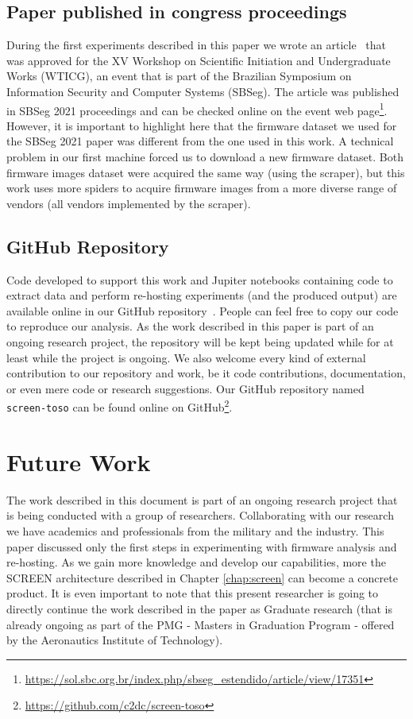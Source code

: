 \subsection{Paper published in congress proceedings}
During the first experiments described in this paper we wrote an article~\cite{sbseg2021} that was approved for the XV Workshop on Scientific Initiation and Undergraduate Works (WTICG), an event that is part of the Brazilian Symposium on Information Security and Computer Systems (SBSeg). The article was published in SBSeg 2021 proceedings and can be checked online on the event web page\footnote{\url{https://sol.sbc.org.br/index.php/sbseg_estendido/article/view/17351}}. However, it is important to highlight here that the firmware dataset we used for the SBSeg 2021 paper was different from the one used in this work. A technical problem in our first machine forced us to download a new firmware dataset. Both firmware images dataset were acquired the same way (using the scraper), but this work uses more spiders to acquire firmware images from a more diverse range of vendors (all vendors implemented by the scraper).

\subsection{GitHub Repository}
Code developed to support this work and Jupiter notebooks containing code to extract data and perform re-hosting experiments (and the produced output) are available online in our GitHub repository~\cite{github:c2dc-toso}. People can feel free to copy our code to reproduce our analysis. As the work described in this paper is part of an ongoing research project, the repository will be kept being updated while for at least while the project is ongoing. We also welcome every kind of external contribution to our repository and work, be it code contributions, documentation, or even mere code or research suggestions. Our GitHub repository named {\tt screen-toso} can be found online on GitHub\footnote{\url{https://github.com/c2dc/screen-toso}}.

\section{Future Work}
\label{sec:future-work}

The work described in this document is part of an ongoing research project that is being conducted with a group of researchers. Collaborating with our research we have academics and professionals from the military and the industry. This paper discussed only the first steps in experimenting with firmware analysis and re-hosting. As we gain more knowledge and develop our capabilities, more the SCREEN architecture described in Chapter \ref{chap:screen} can become a concrete product. It is even important to note that this present researcher is going to directly continue the work described in the paper as Graduate research (that is already ongoing as part of the PMG - Masters in Graduation Program - offered by the Aeronautics Institute of Technology).


